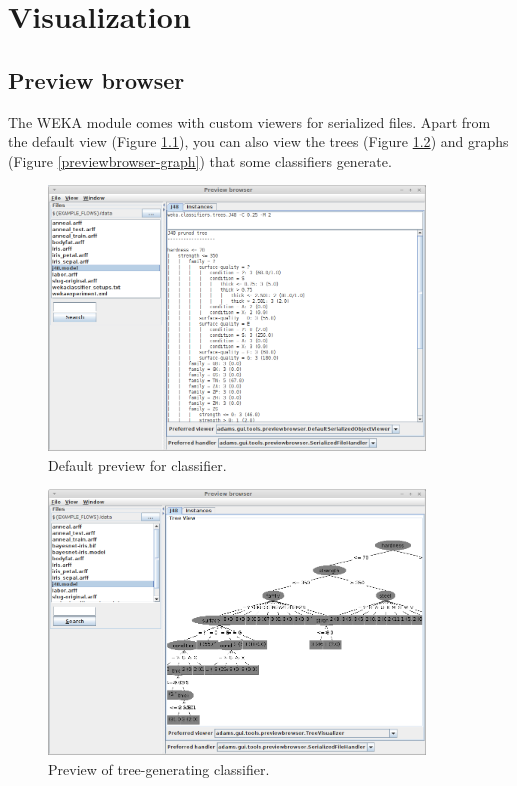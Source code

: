 %

\chapter{Visualization}

\section{Preview browser}
The WEKA module comes with custom viewers for serialized files. Apart from the
default view (Figure \ref{previewbrowser-default}), you can also view the
trees (Figure \ref{previewbrowser-tree}) and graphs (Figure \ref{previewbrowser-graph})
that some classifiers generate.

\begin{figure}[htb]
  \centering
  \includegraphics[width=10.0cm]{images/previewbrowser-default.png}
  \caption{Default preview for classifier.}
  \label{previewbrowser-default}
\end{figure}

\begin{figure}[htb]
  \centering
  \includegraphics[width=10.0cm]{images/previewbrowser-tree.png}
  \caption{Preview of tree-generating classifier.}
  \label{previewbrowser-tree}
\end{figure}

